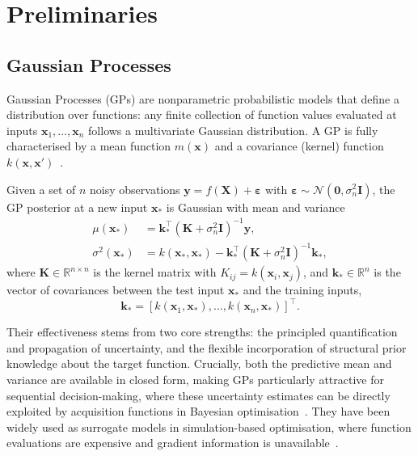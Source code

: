 \documentclass[11pt]{article}
\begin{document}
\section{Preliminaries}
\label{sec:prelim}


\subsection{Gaussian Processes}
\label{sec:prelim_gp}


Gaussian Processes (GPs) are nonparametric probabilistic models that 
define a distribution over functions: any finite collection of function 
values evaluated at inputs $\mathbf{x}_1, \ldots, \mathbf{x}_n$ follows 
a multivariate Gaussian distribution. A GP is fully characterised by a 
mean function $m(\mathbf{x})$ and a covariance (kernel) function 
$k(\mathbf{x}, \mathbf{x}')$~\parencite{rasmussen2006gaussian}.

Given a set of $n$ noisy observations $\mathbf{y} = f(\mathbf{X}) + 
\boldsymbol{\varepsilon}$ with $\boldsymbol{\varepsilon} \sim 
\mathcal{N}(\mathbf{0}, \sigma^2_n \mathbf{I})$, the GP posterior at a 
new input $\mathbf{x}_*$ is Gaussian with mean and variance
\begin{align*}
\mu(\mathbf{x}_*) &= \mathbf{k}_*^\top 
    (\mathbf{K} + \sigma^2_n \mathbf{I})^{-1} \mathbf{y}, \\
\sigma^2(\mathbf{x}_*) &= k(\mathbf{x}_*, \mathbf{x}_*) - 
    \mathbf{k}_*^\top (\mathbf{K} + \sigma^2_n \mathbf{I})^{-1} 
    \mathbf{k}_*,
\end{align*}
where $\mathbf{K} \in \mathbb{R}^{n \times n}$ is the kernel matrix with
$K_{ij} = k(\mathbf{x}_i, \mathbf{x}_j)$, and
$\mathbf{k}_* \in \mathbb{R}^{n}$ is the vector of covariances between the
test input $\mathbf{x}_*$ and the training inputs,
\[
\mathbf{k}_* =
\left[
k(\mathbf{x}_1,\mathbf{x}_*),
\ldots,
k(\mathbf{x}_n,\mathbf{x}_*)
\right]^\top.
\]

Their effectiveness stems from two core strengths: the principled quantification and propagation of uncertainty, and the flexible incorporation of structural prior knowledge about the target function. Crucially, both the predictive mean and variance are available in closed form, making GPs particularly attractive for sequential decision-making, where these uncertainty estimates can be directly exploited by acquisition functions in Bayesian optimisation~\parencite{frazier2018tutorial}. They have been widely used as surrogate models in simulation-based optimisation, where function evaluations are expensive and gradient information is unavailable~\parencite{sacks1989design, santner2003design}.
\end{document}
